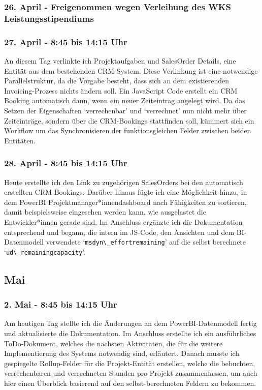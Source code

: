 \subsubsection*{26. April - Freigenommen wegen Verleihung des WKS Leistungsstipendiums}

\subsubsection*{27. April - 8:45 bis 14:15 Uhr}
An diesem Tag verlinkte ich Projektaufgaben und SalesOrder Details, eine Entität aus dem bestehenden CRM-System. Diese Verlinkung ist eine notwendige Parallelstruktur, da die Vorgabe besteht, dass sich an dem existierenden Invoicing-Prozess nichts ändern soll. Ein JavaScript Code erstellt ein CRM Booking automatisch dann, wenn ein neuer Zeiteintrag angelegt wird. Da das Setzen der Eigenschaften \enquote*{verrechenbar} und \enquote*{verrechnet} nun nicht mehr über Zeiteinträge, sondern über die CRM-Bookings stattfinden soll, kümmert sich ein Workflow um das Synchronisieren der funktionsgleichen Felder zwischen beiden Entitäten.

\subsubsection*{28. April - 8:45 bis 14:15 Uhr}
Heute erstellte ich den Link zu zugehörigen SalesOrders bei den automatisch erstellten CRM Bookings. Darüber hinaus fügte ich eine Möglichkeit hinzu, in dem PowerBI Projektmanager*innendashboard nach Fähigkeiten zu sortieren, damit beispielsweise eingesehen werden kann, wie ausgelastet die Entwickler*innen gerade sind. Im Anschluss ergänzte ich die Dokumentation entsprechend und begann, die intern im JS-Code, den Ansichten und dem BI-Datenmodell verwendete \enquote*{\lstinline|msdyn\_effortremaining|} auf die selbst berechnete \enquote*{\lstinline|ud\_remainingcapacity|}.

\subsection{Mai}

\subsubsection*{2. Mai - 8:45 bis 14:15 Uhr}
Am heutigen Tag stellte ich die Änderungen an dem PowerBI-Datenmodell fertig und aktualisierte die Dokumentation. Im Anschluss erstellte ich ein ausführliches ToDo-Dokument, welches die nächsten Aktivitäten, die für die weitere Implementierung des Systems notwendig sind, erläutert. Danach musste ich gespiegelte Rollup-Felder für die Projekt-Entität erstellen, welche die bebuchten, verrechenbaren und verrechneten Stunden pro Projekt zusammenfassen, um auch hier einen Überblick basierend auf den selbst-berechneten Feldern zu bekommen.

